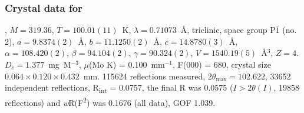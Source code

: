 \begin{refsection}
\subsubsection{Crystal data for \texorpdfstring{}{C16 H21 N3 O4}}
, $M=319.36$, $T=100.01(11)$~K, $\lambda=0.71073$~\AA, triclinic, space group $\text{P}\bar{1}$ (no. 2), $a = 9.8374(2)$~\AA, $b = 11.1250(2)$~\AA, $c = 14.8780(3)$~\AA, $\alpha = 108.420(2)$\degree, $\beta = 94.104(2)$\degree, $\gamma = 90.324(2)$\degree, $V = 1540.19(5)$~\AA$^{3}$, $Z = 4$. $D_{c}= 1.377$~mg~M$^{-3}$, $\mu$(Mo K\a) = 0.100~mm$^{-1}$, F(000) = 680, crystal size $0.064 \times 0.120 \times 0.432$~mm. 115624 reflections measured, $2\theta_{\max}=102.622$\degree, 33652 independent reflections, R\textsubscript{int} = 0.0757, the final R was 0.0575 ($I > 2\theta(I)$, 19858 reflections) and \emph{w}R(F\textsuperscript{2}) was 0.1676 (all data), GOF 1.039. 
\printbibliography[heading=subbibliography]
\end{refsection}